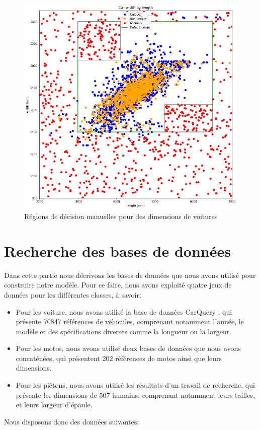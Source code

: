 \documentclass[a4paper]{report}
\begin{document}
\begin{figure}[hb]
\centering
\includegraphics[width=.8\textwidth]{img/first_try.png}
\caption{Régions de décision manuelles pour des dimensions de voitures\label{regions_decision_manuelles_plot}}
\end{figure}

\section{Recherche des bases de données}

Dans cette partie nous décrivons les bases de données que nous avons utilisé pour construire notre modèle. Pour ce faire, nous avons exploité quatre jeux de données pour les différentes classes, à savoir: 
\begin{itemize}
\item Pour les voiture, nous avons utilisé la base de données CarQuery \cite{carquery}, qui présente 70847 références de véhicules, comprenant notamment l’année, le modèle et des spécifications diverses comme la longueur ou la largeur. 
\item Pour les motos, nous avons utilisé deux bases de données \cite{moto1} \cite{moto2} que nous avons concaténées, qui présentent 202 références de motos ainsi que leurs dimensions.
\item Pour les piétons, nous avons utilisé les résultats d’un travail de recherche\cite{doi:10.1080/10691898.2003.11910711}, qui présente les dimensions de 507 humains, comprenant notamment leurs tailles, et leurs largeur d’épaule.
\end{itemize}
\medskip
Nous disposons donc des données suivantes:
\end{document}
